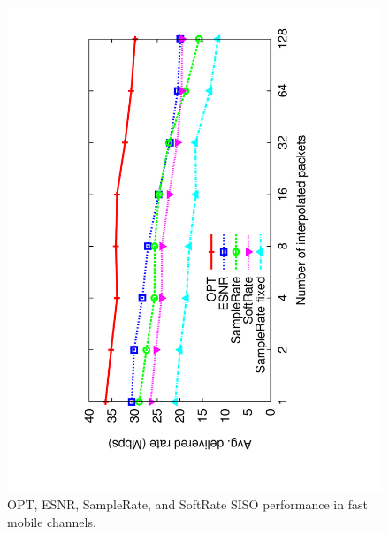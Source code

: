 \begin{figure}[p]
      \centering
      \includegraphics[angle=-90,viewport=120 68 491 760,clip,width=0.95\columnwidth]{figures/siso_rate_skip_opt_eff_sr_so.pdf}
      \vspace{-2pt}
      \caption{\label{fig:siso_rate_skip_opt_eff_sr_so} OPT, ESNR, SampleRate, and SoftRate SISO performance in fast mobile channels.}
      \vspace{-2pt}
\end{figure}


